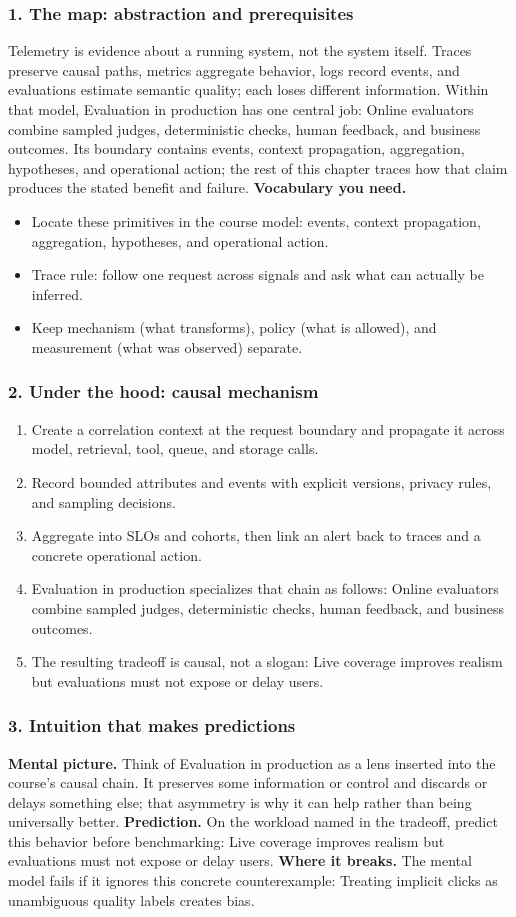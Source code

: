 \subsubsection*{1. The map: abstraction and prerequisites}
Telemetry is evidence about a running system, not the system itself. Traces preserve causal paths, metrics aggregate behavior, logs record events, and evaluations estimate semantic quality; each loses different information.
Within that model, Evaluation in production has one central job: Online evaluators combine sampled judges, deterministic checks, human feedback, and business outcomes. Its boundary contains events, context propagation, aggregation, hypotheses, and operational action; the rest of this chapter traces how that claim produces the stated benefit and failure.
\textbf{Vocabulary you need.}\begin{itemize}
\item Locate these primitives in the course model: events, context propagation, aggregation, hypotheses, and operational action.
\item Trace rule: follow one request across signals and ask what can actually be inferred.
\item Keep mechanism (what transforms), policy (what is allowed), and measurement (what was observed) separate.
\end{itemize}
\subsubsection*{2. Under the hood: causal mechanism}\begin{enumerate}
\item Create a correlation context at the request boundary and propagate it across model, retrieval, tool, queue, and storage calls.
\item Record bounded attributes and events with explicit versions, privacy rules, and sampling decisions.
\item Aggregate into SLOs and cohorts, then link an alert back to traces and a concrete operational action.
\item Evaluation in production specializes that chain as follows: Online evaluators combine sampled judges, deterministic checks, human feedback, and business outcomes.
\item The resulting tradeoff is causal, not a slogan: Live coverage improves realism but evaluations must not expose or delay users.
\end{enumerate}
\subsubsection*{3. Intuition that makes predictions}
\textbf{Mental picture.} Think of Evaluation in production as a lens inserted into the course's causal chain. It preserves some information or control and discards or delays something else; that asymmetry is why it can help rather than being universally better.
\textbf{Prediction.} On the workload named in the tradeoff, predict this behavior before benchmarking: Live coverage improves realism but evaluations must not expose or delay users.
\textbf{Where it breaks.} The mental model fails if it ignores this concrete counterexample: Treating implicit clicks as unambiguous quality labels creates bias.
